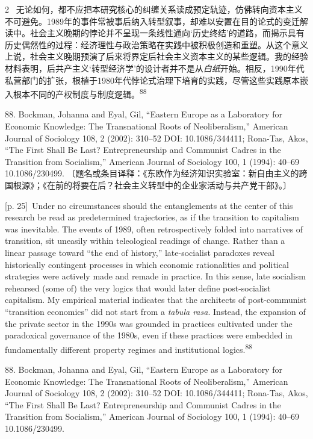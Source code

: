 \documentclass[10pt,a4paper]{article}
\begin{document}
\begin{paracol}{2}
\switchcolumn*
{\scriptsize\color{gray} [p. 25]}\ 无论如何，都不应把本研究核心的纠缠关系读成预定轨迹，仿佛转向资本主义不可避免。1989年的事件常被事后纳入转型叙事，却难以安置在目的论式的变迁解读中。社会主义晚期的悖论并不呈现一条线性通向‘历史终结’的道路，而揭示具有历史偶然性的过程：经济理性与政治策略在实践中被积极创造和重塑。从这个意义上说，社会主义晚期预演了后来将界定后社会主义资本主义的某些逻辑。我的经验材料表明，后共产主义‘转型经济学’的设计者并不是从\textit{白纸}开始。相反，1990年代私营部门的扩张，根植于1980年代悖论式治理下培育的实践，尽管这些实践原本嵌入根本不同的产权制度与制度逻\mbox{辑。\textsuperscript{88}}\par{\small 88. Bockman, Johanna and Eyal, Gil, “Eastern Europe as a Laboratory for Economic Knowledge: The Transnational Roots of Neoliberalism,” American Journal of Sociology 108, 2 (2002): 310–52 DOI: 10.1086/344411; Rona-Tas, Akos, “The First Shall Be Last? Entrepreneurship and Communist Cadres in the Transition from Socialism,” American Journal of Sociology 100, 1 (1994): 40–69 10.1086/230499. 〔题名或条目译释：《东欧作为经济知识实验室：新自由主义的跨国根源》；《在前的将要在后？社会主义转型中的企业家活动与共产党干部》。〕\par}
\switchcolumn
{\scriptsize\color{gray} [p. 25]}\ Under no circumstances should the entanglements at the center of this research be read as predetermined trajectories, as if the transition to capitalism was inevitable. The events of 1989, often retrospectively folded into narratives of transition, sit uneasily within teleological readings of change. Rather than a linear passage toward “the end of history,” late-socialist paradoxes reveal historically contingent processes in which economic rationalities and political strategies were actively made and remade in practice. In this sense, late socialism rehearsed (some of) the very logics that would later define post-socialist capitalism. My empirical material indicates that the architects of post-communist “transition economics” did not start from a \textit{tabula rasa}. Instead, the expansion of the private sector in the 1990s was grounded in practices cultivated under the paradoxical governance of the 1980s, even if these practices were embedded in fundamentally different property regimes and institutional logics.\nobreak\textsuperscript{88}\par{\small 88. Bockman, Johanna and Eyal, Gil, “Eastern Europe as a Laboratory for Economic Knowledge: The Transnational Roots of Neoliberalism,” American Journal of Sociology 108, 2 (2002): 310–52 DOI: 10.1086/344411; Rona-Tas, Akos, “The First Shall Be Last? Entrepreneurship and Communist Cadres in the Transition from Socialism,” American Journal of Sociology 100, 1 (1994): 40–69 10.1086/230499.\par}

\end{paracol}
\end{document}
